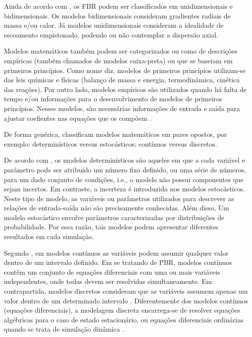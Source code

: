 Ainda de acordo com , os FBR podem ser classificados em
unidimensionais e bidimensionais. Os modelos bidimensionais consideram
gradientes radiais de massa e/ou calor. Já modelos unidimensionais consideram a
idealidade de escoamento empistonado, podendo ou não contemplar a dispersão
axial.

Modelos matemáticos também podem ser categorizados ou como de
descrições empíricas (também chamados de modelos caixa-preta) ou que se baseiam
em primeiros princípios. Como nome diz, modelos de primeiros princípios
utilizam-se das leis químicas e físicas (balanço de massa e energia,
termodinâmica, cinética das reações). Por outro lado, modelos empíricos são
utilizados quando há falta de tempo e/ou informações para o
desenvolvimento de modelos de primeiros princípios. Nesses modelos, são
necessárias informações de entrada e saída para ajustar coefientes nas equações
que os compõem \cite{Edgar2001}.

De forma genérica,  classificam modelos matemáticos
em pares opostos, por exemplo: determinísticos versus estocásticos; contínuos
versus discretos. 

De acordo com , os modelos determinísticos são aqueles
em que a cada variável e parâmetro pode ser atribuído um número fixo definido,
ou uma série de números, para um dado conjunto de condições, i.e., o modelo não
possui componentes que sejam incertos. Em contraste, a incerteza é
introduzida nos modelos estocásticos. Neste tipo de modelo, 
as variáveis ou parâmetros utilizados para descrever as relações de
entrada-saída não são precisamente conhecidas. Além disso, Um modelo estocástico
envolve parâmetros caracterizadas por distribuições de probabilidade. Por essa
razão, tais modelos podem apresentar diferentes resultados em cada simulação.

Segundo , em modelos contínuos as variáveis
podem assumir qualquer valor dentro de um intervalo definido. Em se tratando de
PBR,  modelos contínuos contêm um conjunto de equações
diferenciais com uma ou mais variáveis independentes, onde todas devem ser
resolvidas simultaneamente. Em contrapartida, modelos discretos consideram que as
variáveis assumem apenas um valor dentro de um determinado intervalo
\cite{Rasmuson2014}. Diferentemente dos modelos contínuos (equações
diferenciais), a modelagem discreta encarrega-se de resolver equações algébricas
para o caso de estado estacionário, ou equações diferenciais ordinárias quando
se trata de simulação dinâmica \cite{Schnitzlein1987}.

